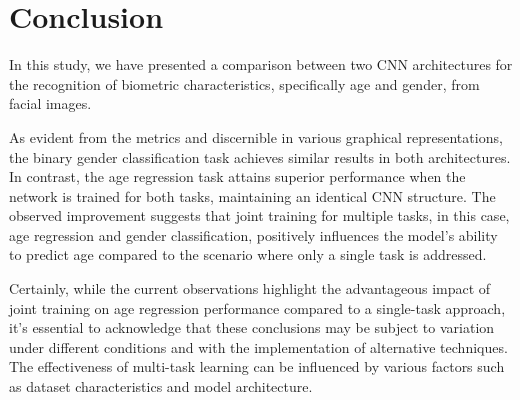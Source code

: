 \section{Conclusion} \label{sec:conclusions}
In this study, we have presented a comparison between two CNN
architectures for the recognition of biometric characteristics,
specifically age and gender, from facial images.

As evident from the metrics and discernible in various graphical
representations, the binary gender classification task achieves similar
results in both architectures. In contrast, the age regression task
attains superior performance when the network is trained for both tasks,
maintaining an identical CNN structure. The observed improvement suggests
that joint training for multiple tasks, in this case, age regression and
gender classification, positively influences the model's ability to predict
age compared to the scenario where only a single task is addressed.

Certainly, while the current observations highlight the advantageous
impact of joint training on age regression performance compared
to a single-task approach, it's essential to acknowledge that these
conclusions may be subject to variation under different conditions
and with the implementation of alternative techniques.
The effectiveness of multi-task learning can be influenced by various
factors such as dataset characteristics and model architecture.